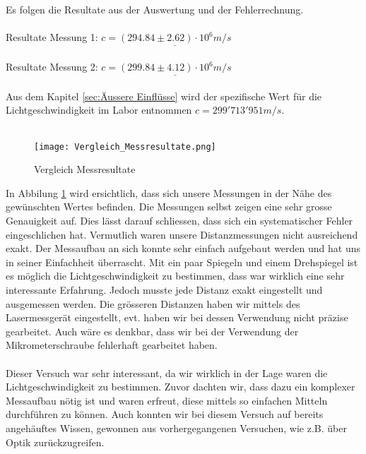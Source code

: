Es folgen die Resultate aus der Auswertung und der Fehlerrechnung.\\
\\
Resultate Messung 1: $c = \underline{(294.84 \pm 2.62) \cdot 10^6 m/s}$\\
\\
Resultate Messung 2: $c = \underline{(299.84 \pm 4.12) \cdot 10^6 m/s}$\\
\\
Aus dem Kapitel \ref{sec:Äussere Einflüsse} wird der spezifische Wert für die Lichtgeschwindigkeit im Labor entnommen $c = 299'713'951 m/s$.\\
\\

\begin{figure}[h]
\texttt{[image: Vergleich\_Messresultate.png]}
\caption{Vergleich Messresultate}
\label{fig:Vergleich Messresultate}
\end{figure}

In Abbilung \ref{fig:Vergleich Messresultate} wird ersichtlich, dass sich unsere Messungen in der Nähe des gewünschten Wertes befinden. Die Messungen selbst zeigen eine sehr grosse Genauigkeit auf. Dies lässt darauf schliessen, dass sich ein systematischer Fehler eingeschlichen hat. Vermutlich waren unsere Distanzmessungen nicht ausreichend exakt. Der Messaufbau an sich konnte sehr einfach aufgebaut werden und hat uns in seiner Einfachheit überrascht. Mit ein paar Spiegeln und einem Drehspiegel ist es möglich die Lichtgeschwindigkeit zu bestimmen, dass war wirklich eine sehr interessante Erfahrung. Jedoch musste jede Distanz exakt eingestellt und ausgemessen werden. Die grösseren Distanzen haben wir mittels des Lasermessgerät eingestellt, evt. haben wir bei dessen Verwendung nicht präzise gearbeitet. Auch wäre es denkbar, dass wir bei der Verwendung der Mikrometerschraube fehlerhaft gearbeitet haben.\\
\\

Dieser Versuch war sehr interessant, da wir wirklich in der Lage waren die Lichtgeschwindigkeit zu bestimmen. Zuvor dachten wir, dass dazu ein komplexer Messaufbau nötig ist und waren erfreut, diese mittels so einfachen Mitteln durchführen zu können. Auch konnten wir bei diesem Versuch auf bereits angehäuftes Wissen, gewonnen aus vorhergegangenen Versuchen, wie z.B. über Optik zurückzugreifen.

